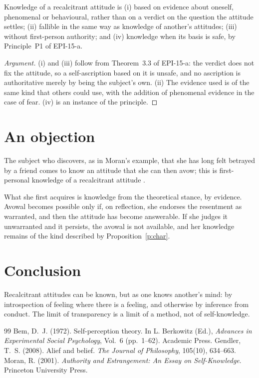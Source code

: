 \documentclass{situationist-preprint}
\begin{document}
\begin{proposition}\label{p:char}
Knowledge of a recalcitrant attitude is (i) based on evidence about oneself, phenomenal or behavioural, rather than on a verdict on the question the attitude settles; (ii) fallible in the same way as knowledge of another's attitudes; (iii) without first-person authority; and (iv) knowledge when its basis is safe, by Principle~P1 of EPI-15-a.
\end{proposition}

\begin{proof}[Argument]
(i) and (iii) follow from Theorem~3.3 of EPI-15-a: the verdict does not fix the attitude, so a self-ascription based on it is unsafe, and no ascription is authoritative merely by being the subject's own. (ii) The evidence used is of the same kind that others could use, with the addition of phenomenal evidence in the case of fear. (iv) is an instance of the principle.
\end{proof}

\section{An objection}

\begin{objection}
The subject who discovers, as in Moran's example, that she has long felt betrayed by a friend comes to know an attitude that she can then avow; this is first-personal knowledge of a recalcitrant attitude \citep{Moran2001}.
\end{objection}

\begin{reply}
What she first acquires is knowledge from the theoretical stance, by evidence. Avowal becomes possible only if, on reflection, she endorses the resentment as warranted, and then the attitude has become answerable. If she judges it unwarranted and it persists, the avowal is not available, and her knowledge remains of the kind described by Proposition~\ref{p:char}.
\end{reply}

\section{Conclusion}

Recalcitrant attitudes can be known, but as one knows another's mind: by introspection of feeling where there is a feeling, and otherwise by inference from conduct. The limit of transparency is a limit of a method, not of self-knowledge.

\begin{thebibliography}{99}\small
{} Bem, D.~J. (1972). Self-perception theory. In L. Berkowitz (Ed.), \emph{Advances in Experimental Social Psychology}, Vol.~6 (pp.~1--62). Academic Press.
 Gendler, T.~S. (2008). Alief and belief. \emph{The Journal of Philosophy}, 105(10), 634--663.
 Moran, R. (2001). \emph{Authority and Estrangement: An Essay on Self-Knowledge}. Princeton University Press.
\end{thebibliography}
\end{document}
